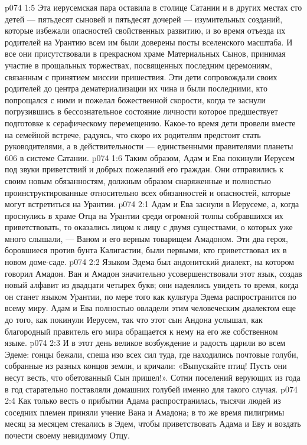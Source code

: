 \vs p074 1:5 \pc Эта иерусемская пара оставила в столице Сатании и в других местах сто детей --- пятьдесят сыновей и пятьдесят дочерей --- изумительных созданий, которые избежали опасностей свойственных развитию, и во время отъезда их родителей на Урантию всем им были доверены посты вселенского масштаба. И все они присутствовали в прекрасном храме Материальных Сынов, принимая участие в прощальных торжествах, посвященных последним церемониям, связанным с принятием миссии пришествия. Эти дети сопровождали своих родителей до центра дематериализации их чина и были последними, кто попрощался с ними и пожелал божественной скорости, когда те заснули погрузившись в бессознательное состояние личности которое предшествует подготовке к серафическому перемещению. Какое\hyp{}то время дети провели вместе на семейной встрече, радуясь, что скоро их родителям предстоит стать руководителями, а в действительности --- единственными правителями планеты 606 в системе Сатании.
\vs p074 1:6 Таким образом, Адам и Ева покинули Иерусем под звуки приветствий и добрых пожеланий его граждан. Они отправились к своим новым обязанностям, должным образом снаряженные и полностью проинструктированные относительно всех обязанностей и опасностей, которые могут встретиться на Урантии.
\vs p074 2:1 Адам и Ева заснули в Иерусеме, а, когда проснулись в храме Отца на Урантии среди огромной толпы собравшихся их приветствовать, то оказались лицом к лицу с двумя существами, о которых уже много слышали, --- Ваном и его верным товарищем Амадоном. Эти два героя, боровшиеся против бунта Калигастии, были первыми, кто приветствовал их в новом доме\hyp{}саде.
\vs p074 2:2 Языком Эдема был андонитский диалект, на котором говорил Амадон. Ван и Амадон значительно усовершенствовали этот язык, создав новый алфавит из двадцати четырех букв; они надеялись увидеть то время, когда он станет языком Урантии, по мере того как культура Эдема распространится по всему миру. Адам и Ева полностью овладели этим человеческим диалектом еще до того, как покинули Иерусем, так что этот сын Андона услышал, как благородный правитель его мира обращается к нему на его же собственном языке.
\vs p074 2:3 И в этот день великое возбуждение и радость царили во всем Эдеме: гонцы бежали, спеша изо всех сил туда, где находились почтовые голуби, собранные из разных концов земли, и кричали: «Выпускайте птиц! Пусть они несут весть, что обетованный Сын пришел!». Сотни поселений верующих из года в год старательно поставляли домашних голубей именно для такого случая.
\vs p074 2:4 \pc Как только весть о прибытии Адама распространилась, тысячи людей из соседних племен приняли учение Вана и Амадона; в то же время пилигримы месяц за месяцем стекались в Эдем, чтобы приветствовать Адама и Еву и воздать почести своему невидимому Отцу.
